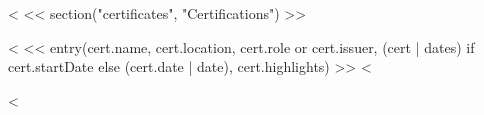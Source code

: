 <%
<< section("certificates", "Certifications") >>
\begin{description}
<%
<< entry(cert.name, cert.location, cert.role or cert.issuer, (cert | dates) if cert.startDate else (cert.date | date), cert.highlights) >>
<%
\end{description}

<%

